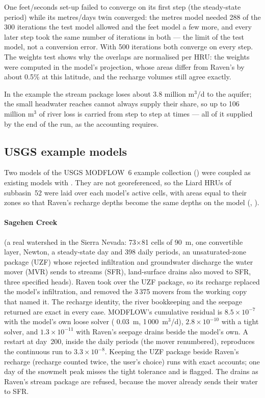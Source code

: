 One feet/seconds set-up failed to converge on its first step (the steady-state period) while its metres/days twin converged:
the metres model needed 288 of the 300 iterations the test model allowed and the feet model a few more, and every later step
took the same number of iterations in both --- the limit of the test model, not a conversion error. With 500 iterations both
converge on every step. The weights test shows why the overlaps are normalised per HRU: the weights were computed in the model's projection, whose
areas differ from Raven's by about 0.5\% at this latitude, and the recharge volumes still agree exactly.

In the example the stream package loses about 3.8 million m$^3$/d to the aquifer; the small headwater reaches
cannot always supply their share, so up to 106 million m$^3$ of river loss is carried from step to step at times --- all of it
supplied by the end of the run, as the accounting requires.

\subsection{USGS example models}\label{sec:usgs}
Two models of the USGS MODFLOW~6 example collection () were coupled as existing models with
. They are not georeferenced, so the Liard HRUs of subbasin~52 were laid over each model's active cells,
with  areas equal to their zones so that Raven's recharge depths become the same depths on the model
(, ).

\paragraph{Sagehen Creek} (a real watershed in the Sierra Nevada: 73$\times$81 cells of 90~m, one convertible layer,
Newton, a steady-state day and 398 daily periods, an unsaturated-zone package (UZF) whose rejected infiltration and
groundwater discharge the water mover (MVR) sends to streams (SFR), land-surface drains also moved to SFR, three specified
heads). Raven took over the UZF package, so its recharge replaced the model's infiltration, and removed the 3\,375 movers
from the working copy that named it. The recharge identity, the river bookkeeping and the seepage returned are exact in every
case. MODFLOW's cumulative residual is $8.5\times10^{-7}$ with the model's own loose solver ( 0.03~m,
 1\,000~m$^3$/d), $2.8\times10^{-10}$ with a tight solver, and $1.3\times10^{-11}$ with Raven's seepage
drains beside the model's own. A restart at day~200, inside the daily periods (the mover renumbered), reproduces the
continuous run to $3.3\times10^{-8}$. Keeping the UZF package beside Raven's recharge (recharge counted twice, the user's
choice) runs with exact accounts; one day of the snowmelt peak misses the tight tolerance and is flagged. The drains as
Raven's stream package are refused, because the mover already sends their water to SFR.

